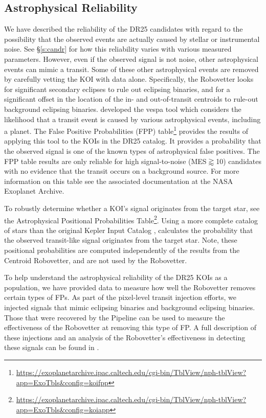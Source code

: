\subsection{Astrophysical Reliability}
We have described the reliability of the DR25 candidates with regard to the possibility that the observed events are actually caused by stellar or instrumental noise. See \S\ref{s:candr} for how this reliability varies with various measured parameters.  However, even if the observed signal is not noise, other astrophysical events can mimic a transit.  Some of these other astrophysical events are removed by carefully vetting the KOI with \Kepler{} data alone.  Specifically, the Robovetter looks for significant secondary eclipses to rule out eclipsing binaries, and for a significant offset in the location of the in- and out-of-transit centroids to rule-out background eclipsing binaries. \citet[][]{Morton2016} developed the vespa tool which considers the likelihood that a transit event is caused by various astrophysical events, including a planet.  The False Positive Probabilities (FPP) table\footnote{\url{https://exoplanetarchive.ipac.caltech.edu/cgi-bin/TblView/nph-tblView?app=ExoTbls&config=koifpp}} provides the results of applying this tool to the KOIs in the DR25 catalog. It provides a probability that the observed signal is one of the known types of astrophysical false positives.  The FPP table results are only reliable for high signal-to-noise (MES$\gtrapprox$10) candidates with no evidence that the transit occurs on a background source.  For more information on this table see the associated documentation at the NASA Exoplanet Archive.

To robustly determine whether a KOI's signal originates from the target star, see the Astrophysical Positional Probabilities Table\footnote{\url{https://exoplanetarchive.ipac.caltech.edu/cgi-bin/TblView/nph-tblView?app=ExoTbls&config=koiapp}}.  Using a more complete catalog of stars than the original Kepler Input Catalog \citet{Brown2011}, \citet{Bryson2017a} calculates the probability that the observed transit-like signal originates from the target star. Note, these positional probabilities are computed independently of the results from the Centroid Robovetter, and are not used by the Robovetter. 

To help understand the astrophysical reliability of the DR25 KOIs as a population, we have provided data to measure how well the Robovetter removes certain types of FPs.  As part of the pixel-level transit injection efforts, we injected signals that mimic eclipsing binaries and background eclipsing binaries. Those that were recovered by the \Kepler{} Pipeline can be used to measure the effectiveness of the Robovetter at removing this type of FP. A full description of these injections and an analysis of the Robovetter's effectiveness in detecting these signals can be found in \citet{Coughlin2017a}.



